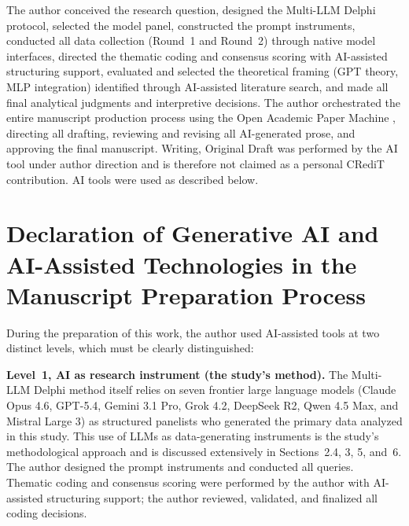 \documentclass[preprint,review,12pt]{elsarticle}
\begin{document}
The author conceived the research question, designed the Multi-LLM Delphi protocol, selected the model panel, constructed the prompt instruments, conducted all data collection (Round~1 and Round~2) through native model interfaces, directed the thematic coding and consensus scoring with AI-assisted structuring support, evaluated and selected the theoretical framing (GPT theory, MLP integration) identified through AI-assisted literature search, and made all final analytical judgments and interpretive decisions. The author orchestrated the entire manuscript production process using the Open Academic Paper Machine \citep{blask2026openpapermachine}, directing all drafting, reviewing and revising all AI-generated prose, and approving the final manuscript. Writing, Original Draft was performed by the AI tool under author direction and is therefore not claimed as a personal CRediT contribution. AI tools were used as described below.

\section*{Declaration of Generative AI and AI-Assisted Technologies in the Manuscript Preparation Process}

During the preparation of this work, the author used AI-assisted tools at two distinct levels, which must be clearly distinguished:

\textbf{Level~1, AI as research instrument (the study's method).} The Multi-LLM Delphi method itself relies on seven frontier large language models (Claude Opus 4.6, GPT-5.4, Gemini 3.1 Pro, Grok 4.2, DeepSeek R2, Qwen 4.5 Max, and Mistral Large 3) as structured panelists who generated the primary data analyzed in this study. This use of LLMs as data-generating instruments is the study's methodological approach and is discussed extensively in Sections~2.4, 3, 5, and~6. The author designed the prompt instruments and conducted all queries. Thematic coding and consensus scoring were performed by the author with AI-assisted structuring support; the author reviewed, validated, and finalized all coding decisions.
\end{document}
